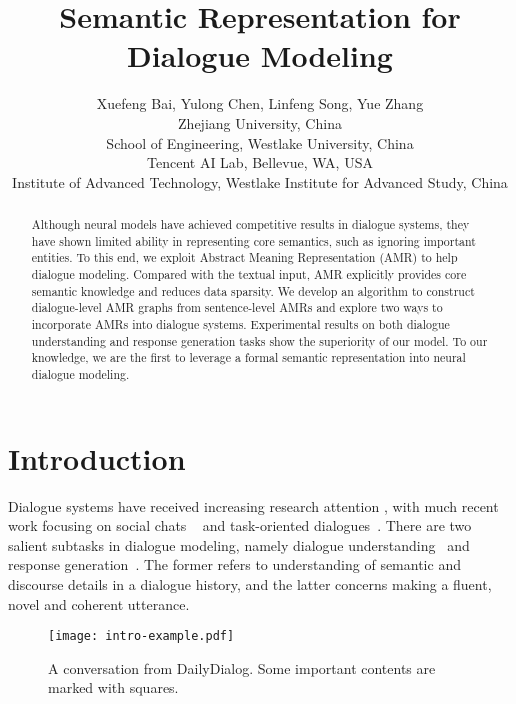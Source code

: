 \documentclass[11pt,a4paper]{article}
\title{Semantic Representation for Dialogue Modeling}
\author{
 Xuefeng Bai\hspace{0.5mm}, 
 Yulong Chen\hspace{0.5mm}, 
 Linfeng Song\hspace{0.5mm}, 
 Yue Zhang\hspace{0.2mm}\hspace{1.5mm} \\
  Zhejiang University, China\\
  School of Engineering, Westlake University, China\\
  Tencent AI Lab, Bellevue, WA, USA\\
  Institute of Advanced Technology, Westlake Institute for Advanced Study, China
}
\date{}
\begin{document}
\maketitle
\begin{abstract}
Although neural models have achieved competitive results in dialogue systems, they have shown limited ability in representing core semantics, such as ignoring important entities.
To this end, we exploit Abstract Meaning Representation (AMR) to help dialogue modeling. 
Compared with the textual input, AMR explicitly provides core semantic knowledge and reduces data sparsity.
We develop an algorithm to construct dialogue-level AMR graphs from sentence-level AMRs and explore two ways to incorporate AMRs into dialogue systems.
Experimental results on both dialogue understanding and response generation tasks show the superiority of our model.
To our knowledge, we are the first to leverage a formal semantic representation into neural dialogue modeling.
\end{abstract}

\section{Introduction}
Dialogue systems have received increasing research attention \cite{wen2015semantically,serban2016hierarchical,bao-etal-2020-plato}, with much recent work focusing on social chats ~\citep{ritter-etal-2011-data,li-etal-2017-dailydialog} and task-oriented dialogues~\citep{wen-etal-2017-network,dinan2018wizard}.
There are two salient subtasks in dialogue modeling, namely dialogue understanding~\citep{ChoiHIYYCLZ18,ReddyCM19,yu-2020-dialogue} and response generation~\citep{li-etal-2017-dailydialog,budzianowski2018multiwoz}.
The former refers to understanding of semantic and discourse details in a dialogue history, and the latter concerns making a fluent, novel and coherent utterance.
\begin{figure}[t!]
	\centering
	\texttt{[image: intro-example.pdf]}
	\caption{A conversation from DailyDialog. Some important contents are marked with squares.}
	\label{fig:example}
\end{figure}
\end{document}
